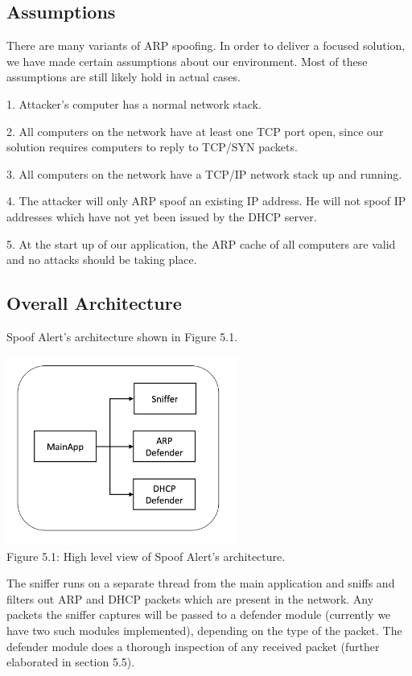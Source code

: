 \documentclass{acm_proc_article-sp}
\begin{document}
\subsection{Assumptions}

There are many variants of ARP spoofing. In order to deliver a focused solution, we have made certain assumptions about our environment. Most of these assumptions are still likely hold in actual cases.

1. Attacker's computer has a normal network stack. 

2. All computers on the network have at least one TCP port open, since our solution requires computers to reply to TCP/SYN packets.

3. All computers on the network have a TCP/IP network stack up and running. 

4. The attacker will only ARP spoof an existing IP address. He will not spoof IP addresses which have not yet been issued by the DHCP server. 

5. At the start up of our application, the ARP cache of all computers are valid and no attacks should be taking place.


\subsection{Overall Architecture}
Spoof Alert's architecture shown in Figure 5.1. 

\includegraphics[width=3in]{architecture01.png} \\
Figure 5.1: High level view of Spoof Alert's architecture.

The sniffer runs on a separate thread from the main application and sniffs and filters out ARP and DHCP packets which are present in the network. Any packets the sniffer captures will be passed to a defender module (currently we have two such modules implemented), depending on the type of the packet. The defender module does a thorough inspection of any received packet (further elaborated in section 5.5). 
\end{document}
